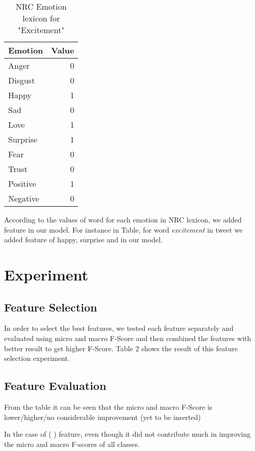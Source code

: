 \documentclass[11pt]{article}
\begin{document}
\begin{table}[h]
\begin{center}
\begin{tabular}{|l|r|}
\hline \bf Emotion & \bf Value\\ \hline
Anger & 0\\
Disgust & 0\\
Happy & 1\\
Sad & 0\\
Love & 1\\
Surprise & 1\\
Fear & 0\\
Trust & 0\\
Positive & 1\\
Negative & 0\\
\hline
\end{tabular}
\end{center}
\caption{\label{font-table} NRC Emotion lexicon for "Excitement"}
\end{table}

According to the values of word for each emotion in NRC lexicon, we added feature in our model. For instance in Table, for word \emph{excitement} in tweet we
added feature of happy, surprise and in our model.

\section{Experiment}

\subsection{Feature Selection}

In order to select the best features, we tested each feature separately and evaluated using micro and macro F-Score and then combined the features
with better result to get higher F-Score. Table 2 shows the result of this feature selection experiment.

\subsection{Feature Evaluation}

From the table it can be seen that the micro and macro F-Score is lower/higher/no considerable improvement (yet to be inserted)


In the case of ( ) feature, even though it did not contribute much in improving the micro and macro F-scores of all classes.
\end{document}
